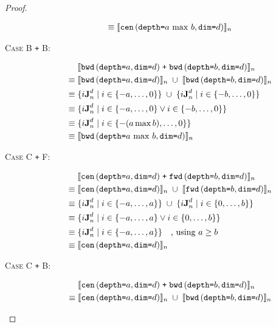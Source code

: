 \begin{proof}
\begin{description}
\begin{align*}
      \equiv & \; \interp{\stenCenS{a \, \max \, b}{d}}_n \\
    \end{align*}
  \item[\textsc{Case B \texttt{+} B}:]
    \begin{align*}
      & \; \interp{\stenBwdS{a}{d} \; \texttt{+} \; \stenBwdS{b}{d}}_{n} \\
      \equiv & \; \interp{\stenBwdS{a}{d}}_{n} \; \cup \; \interp{\stenBwdS{b}{d}}_{n} \\
      \equiv & \; \{i\singleEntry{d}{n} \mid i \in \{-a, \ldots, 0\} \} \; \cup \;
                  \{i\singleEntry{d}{n} \mid i \in \{-b, \ldots, 0\} \} \\
      \equiv & \; \{i\singleEntry{d}{n} \mid i \in \{-a, \ldots, 0\}
                    \vee i \in \{-b, \ldots, 0\} \} \\
      \equiv & \; \{i\singleEntry{d}{n} \mid i \in \{- (a \max b), \ldots, 0\} \} \\
      \equiv & \; \interp{\stenBwdS{a \, \max \, b}{d}}_n \\
    \end{align*}
  \item[\textsc{Case C \texttt{+} F}:]
    \begin{align*}
      & \; \interp{\stenCenS{a}{d} \; \texttt{+} \; \stenFwdS{b}{d}}_{n} \\
      \equiv & \; \interp{\stenCenS{a}{d}}_{n} \; \cup \; \interp{\stenFwdS{b}{d}}_{n} \\
      \equiv & \; \{i\singleEntry{d}{n} \mid i \in \{-a, \ldots, a\} \} \; \cup \;
                  \{i\singleEntry{d}{n} \mid i \in \{0, \ldots, b\} \} \\
      \equiv & \; \{i\singleEntry{d}{n} \mid i \in \{-a, \ldots, a\}
                    \vee i \in \{0, \ldots, b\} \} \\
      \equiv & \; \{i\singleEntry{d}{n} \mid i \in \{-a, \ldots, a\} \} \quad \text{, using }a \geq b \\
      \equiv & \; \interp{\stenCenS{a}{d}}_n \\
    \end{align*}
  \item[\textsc{Case C \texttt{+} B}:]
    \begin{align*}
      & \; \interp{\stenCenS{a}{d} \; \texttt{+} \; \stenBwdS{b}{d}}_{n} \\
      \equiv & \; \interp{\stenCenS{a}{d}}_{n} \; \cup \; \interp{\stenBwdS{b}{d}}_{n} \\

\end{align*}
\end{description}
\end{proof}
